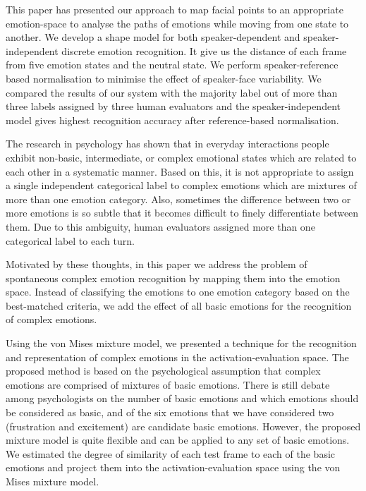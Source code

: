 \documentclass[10pt,journal,cspaper,compsoc]{IEEEtran}
\begin{document}
This paper has presented our approach to map facial points to an appropriate emotion-space to analyse the paths of emotions while moving from one state to another. We develop a shape model for both speaker-dependent and speaker-independent discrete emotion recognition. It give us the distance of each frame from five emotion states and the neutral state. We perform speaker-reference based normalisation to minimise the effect of speaker-face variability. We compared the results of our system with the majority label out of more than three labels assigned by three human evaluators and the speaker-independent model gives highest recognition accuracy after reference-based normalisation.

The research in psychology has shown that in everyday interactions people exhibit non-basic, intermediate, or complex emotional states which are related to each other in a systematic manner. Based on this, it is not appropriate to assign a single independent categorical label to complex emotions which are mixtures of more than one emotion category. Also, sometimes the difference between two or more emotions is so subtle that it becomes difficult to finely differentiate between them. Due to this ambiguity, human evaluators assigned more than one categorical label to each turn.

Motivated by these thoughts, in this paper we address the problem of spontaneous complex emotion recognition by mapping them into the emotion space. Instead of classifying the emotions to one emotion category based on the best-matched criteria, we add the effect of all basic emotions for the recognition of complex emotions. 

Using the von Mises mixture model, we presented a technique for the recognition and representation of complex emotions in the activation-evaluation space. The proposed method is based on the psychological assumption that complex emotions are comprised of mixtures of basic emotions. There is still debate among psychologists on the number of basic emotions and which emotions should be considered as basic, and of the six emotions that we have considered two (frustration and excitement) are candidate basic emotions. However, the proposed mixture model is quite flexible and can be applied to any set of basic emotions. We estimated the degree of similarity of each test frame to each of the basic emotions and project them into the activation-evaluation space using the von Mises mixture model.
\end{document}
